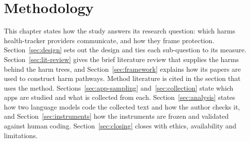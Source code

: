 \chapter{Methodology}
\label{ch:methodology}

This chapter states how the study answers its research question: which harms health-tracker
providers communicate, and how they frame protection. Section~\ref{sec:design} sets out the
design and ties each sub-question to its measure. Section~\ref{sec:lit-review} gives the
brief literature review that supplies the harms behind the harm trees, and
Section~\ref{sec:framework} explains how its papers are used to construct harm
pathways. Method literature is cited in the section that uses the method. Sections~\ref{sec:app-sampling} and~\ref{sec:collection} state which apps are studied
and what is collected from each. Section~\ref{sec:analysis} states how two language models code
the collected text and how the author checks it, and Section~\ref{sec:instruments} how the
instruments are frozen and validated against human coding. Section~\ref{sec:closing} closes
with ethics, availability and limitations.

